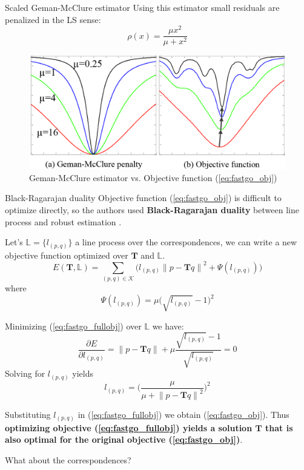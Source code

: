 \documentclass[aspectratio=1610]{beamer}
\renewcommand*{\cite}{\parencite}
\newcommand{\norm}[1]{\left\lVert#1\right\rVert}
\begin{document}
\begin{frame}{Scaled Geman-McClure estimator}
Using this estimator small residuals are penalized in the LS sense:
\begin{equation}
\rho(x)=\frac{\mu x^2}{\mu+x^2}
\end{equation}
\begin{figure}[htbp]
\begin{center}
\includegraphics[width=\textwidth,height=0.5\textheight,keepaspectratio]{imgs/geman_estimator.png}
\caption{Geman-McClure estimator vs. Objective function (\ref{eq:fastgo_obj})}
\label{fig:geman}
\end{center}
\end{figure}
\end{frame}

\begin{frame}[allowframebreaks]{Black-Ragarajan duality}
Objective function (\ref{eq:fastgo_obj}) is difficult to optimize directly, so the authors used \textbf{Black-Ragarajan duality} between line process and robust estimation \cite{black1996unification}.

Let's $\mathbb{L}=\{l_{(p,q)}\}$ a line process over the correspondences, we can write a new objective function optimized over $\bm{T}$ and $\mathbb{L}$.
\begin{equation}
\label{eq:fastgo_fullobj}
E(\bm{T},\mathbb{L})=\sum_{(p,q)\in\mathcal{K}}\big(l_{(p,q)}\norm{p-\bm{T}q}^2+\Psi(l_{(p,q)})\big)
\end{equation}
where  
\[ \Psi(l_{(p,q)}) = \mu \big( \sqrt{l_{(p,q)}} -1 \big)^2 \]

Minimizing (\ref{eq:fastgo_fullobj}) over $\mathbb{L}$ we have:
\[ \frac{\partial{E}}{\partial{l_{(p,q)}}} = \norm{p-\bm{T}q} +\mu\frac{\sqrt{l_{(p,q)}} -1}{\sqrt{l_{(p,q)}}}  = 0 \]
Solving for $l_{(p,q)}$ yields
\begin{equation}\label{eq:fgr_lattice}
 l_{(p,q)} =  \Bigg( \frac{\mu}{\mu + \norm{p-\bm{T}q}^2}  \Bigg)^2
 \end{equation}

Substituting $l_{(p,q)}$ in (\ref{eq:fastgo_fullobj}) we obtain (\ref{eq:fastgo_obj}). Thus \textbf{optimizing objective (\ref{eq:fastgo_fullobj}) yields a solution $\bm{T}$ that is also optimal for the original objective (\ref{eq:fastgo_obj})}.

\alert{What about the correspondences?}
\end{frame}
\end{document}
